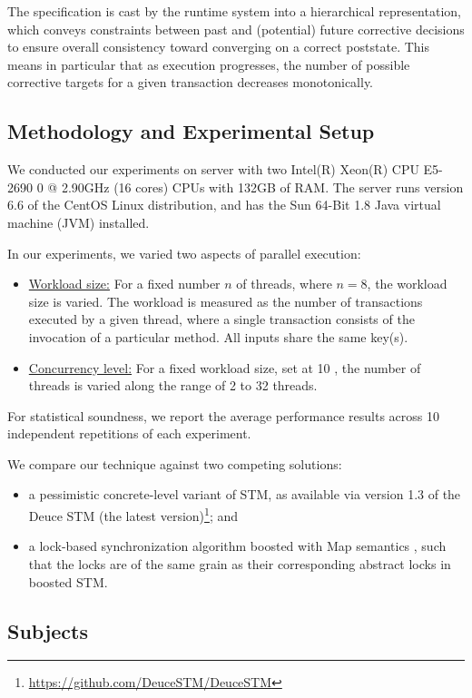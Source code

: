 The specification is cast by the runtime system into a hierarchical representation, which conveys constraints between past and (potential) future corrective decisions to ensure overall consistency toward converging on a correct poststate. This means in particular that as execution progresses, the number of possible corrective targets for a given transaction decreases monotonically.

\subsection{Methodology and Experimental Setup}

We conducted our experiments on server with two Intel(R) Xeon(R) CPU E5-2690 0 @ 2.90GHz (16 cores) CPUs with 132GB of RAM. The server runs version
6.6 of the CentOS Linux distribution, and has the Sun 64-Bit 1.8 Java virtual machine (JVM) installed.

In our experiments, we varied two aspects of parallel execution:
\begin{itemize}
	\item \underline{Workload size:} For a fixed number $n$ of threads, where $n=8$,  the workload size is varied. The workload is measured as the number of transactions executed by a given thread, where a single transaction consists of the invocation of a particular method. All inputs share the same key(s).
	\item \underline{Concurrency level:} For a fixed workload size, set at 10%
	, the number of threads is varied along the range of 2 to 32 threads.  
\end{itemize}
For statistical soundness, we report the average performance results across 10 independent repetitions of each experiment.

We compare our technique against two competing solutions:
\begin{itemize}
	\item a pessimistic concrete-level variant of STM, as available via version 1.3 of the Deuce STM (the latest version)\footnote{
		\url{https://github.com/DeuceSTM/DeuceSTM}
	}; and
	\item a lock-based synchronization algorithm boosted with {\sf Map} semantics \cite{ppopp/HerlihyK08}, such that the locks are of the same grain as their corresponding abstract locks in boosted STM.
\end{itemize}

\subsection{Subjects}

